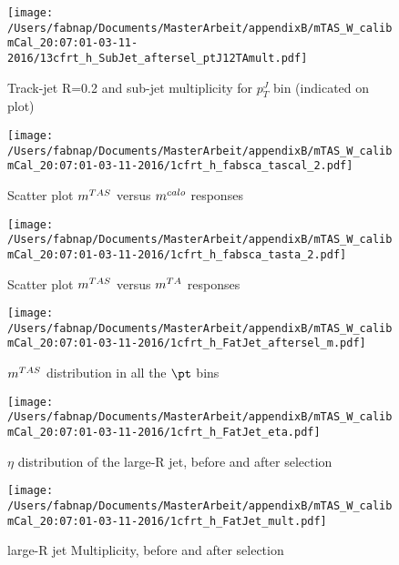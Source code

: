 \begin{figure}

\texttt{[image: /Users/fabnap/Documents/MasterArbeit/appendixB/mTAS\_W\_calibmCal\_20:07:01-03-11-2016/13cfrt\_h\_SubJet\_aftersel\_ptJ12TAmult.pdf]}
\caption{Track-jet R=0.2 and sub-jet multiplicity for $p_{T}^{J}$ bin (indicated on plot) }

\end{figure}

\clearpage

\begin{figure}

\texttt{[image: /Users/fabnap/Documents/MasterArbeit/appendixB/mTAS\_W\_calibmCal\_20:07:01-03-11-2016/1cfrt\_h\_fabsca\_tascal\_2.pdf]}
\caption{Scatter plot $m^{TAS}$ versus $m^{calo}$ responses}

\end{figure}
 
\begin{figure}
 
\texttt{[image: /Users/fabnap/Documents/MasterArbeit/appendixB/mTAS\_W\_calibmCal\_20:07:01-03-11-2016/1cfrt\_h\_fabsca\_tasta\_2.pdf]}
\caption{Scatter plot $m^{TAS}$ versus $m^{TA}$ responses}
 
\end{figure}
 
\begin{figure}
 
\texttt{[image: /Users/fabnap/Documents/MasterArbeit/appendixB/mTAS\_W\_calibmCal\_20:07:01-03-11-2016/1cfrt\_h\_FatJet\_aftersel\_m.pdf]}
\caption{$m^{TAS}$ distribution in all the $\pt$ bins}
 
\end{figure}
 
\begin{figure}
 
\texttt{[image: /Users/fabnap/Documents/MasterArbeit/appendixB/mTAS\_W\_calibmCal\_20:07:01-03-11-2016/1cfrt\_h\_FatJet\_eta.pdf]}
\caption{$\eta$ distribution of the large-R jet, before and after selection}
 
\end{figure}

\begin{figure}
 
\texttt{[image: /Users/fabnap/Documents/MasterArbeit/appendixB/mTAS\_W\_calibmCal\_20:07:01-03-11-2016/1cfrt\_h\_FatJet\_mult.pdf]}
\caption{large-R jet Multiplicity, before and after selection}
 
\end{figure}
 
